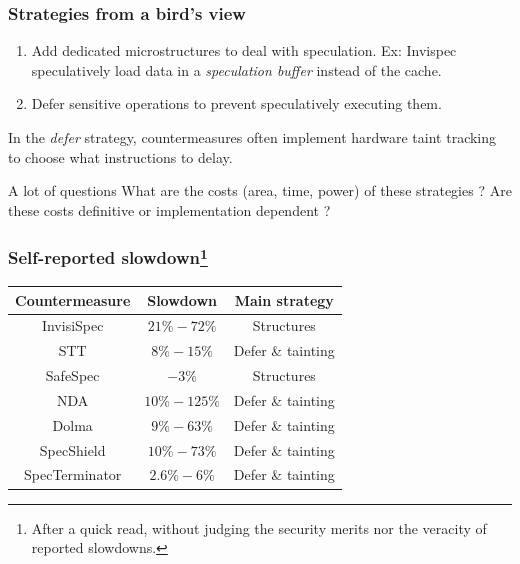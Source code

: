 \documentclass[11pt]{beamer}
\begin{document}
\begin{frame}
    \frametitle{Strategies from a bird's view}

    \begin{enumerate}
        \item Add dedicated microstructures to deal with speculation. Ex: Invispec speculatively load data in a \textit{speculation buffer} instead of the cache.
        \item Defer sensitive operations to prevent speculatively executing them.
    \end{enumerate}

    In the \textit{defer} strategy, countermeasures often implement hardware taint tracking to choose what instructions to delay.
    
    \begin{block}{A lot of questions}
        What are the costs (area, time, power) of these strategies ?
        Are these costs definitive or implementation dependent ?
    \end{block}

\end{frame}



\begin{frame}
    \frametitle{Self-reported slowdown\footnote{After a quick read, without judging the security merits nor the veracity of reported slowdowns.}}

    

    \begin{center}
        \begin{tabular}{|c | c  | c |}
        \hline Countermeasure & Slowdown & Main strategy\\
        \hline InvisiSpec & $21\%-72\%$  & Structures \\
        STT & $8\%-15\%$ & Defer \& tainting \\
        SafeSpec & $-3\%$ &  Structures \\
        NDA &  $10\%-125\%$ & Defer \& tainting\\
        Dolma &  $9\%-63\%$ & Defer \& tainting\\
        SpecShield & $10\%-73\%$ & Defer \& tainting \\
        SpecTerminator & $2.6\%-6\%$ & Defer \& tainting \\ 
        \hline
        \end{tabular}
    \end{center}

\end{frame}
\end{document}

